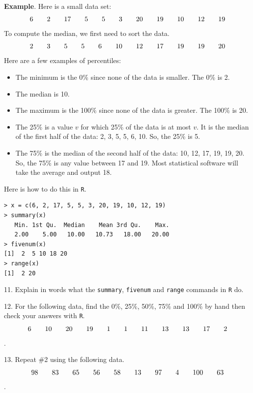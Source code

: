 \documentclass[10pt]{article}
\begin{document}
\textbf{Example}.  Here is a small data set:\vspace{-5pt}
\[6\HS 2\HS 17\HS 5\HS 5\HS 3\HS 20\HS 19\HS 10\HS 12\HS 19\vspace{-5pt}\]
To compute the median, we first need to sort the data.\vspace{-5pt}
\[2\HS 3\HS  5\HS  5\HS  6\HS 10\HS 12\HS 17\HS 19\HS 19\HS 20\vspace{-5pt}\]
Here are a few examples of percentiles:
\begin{itemize}
\item The minimum is the 0\% since none of the data is smaller.  The 0\% is 2.
\item The median is 10.
\item The maximum is the 100\% since none of the data is greater.  The 100\% is 20.
\item The 25\% is a value $v$ for which 25\% of the data is at most $v$.  It is 
   the median of the first half of the data: 2, 3, 5, 5, 6, 10.  So, the 25\% is 5.
\item The 75\% is the median of the second half of the data:  10, 12, 17, 19, 19, 20.
   So, the 75\% is any value  between 17 and 19.  Most statistical software will 
   take the average and output 18.
\end{itemize}
Here is how to do this in \texttt{R}.\vspace{-8pt}
\begin{verbatim}
> x = c(6, 2, 17, 5, 5, 3, 20, 19, 10, 12, 19)
> summary(x)
   Min. 1st Qu.  Median    Mean 3rd Qu.    Max. 
   2.00    5.00   10.00   10.73   18.00   20.00 
> fivenum(x)  
[1]  2  5 10 18 20
> range(x)
[1]  2 20
\end{verbatim}\vspace{-5pt}

11. Explain in words what the \texttt{summary}, \texttt{fivenum} and
\texttt{range} commands in \texttt{R} do.
\vspace{.7in}

12. For the following data, find the 0\%, 25\%, 50\%, 75\% and 100\%
by hand then check your answers with \texttt{R}.\vspace{-3pt}
\[6\hspace{20pt} 10\hspace{20pt} 20\hspace{20pt} 19\hspace{20pt}  1\hspace{20pt}  1\hspace{20pt} 11\hspace{20pt} 13\hspace{20pt} 13\hspace{20pt} 17\hspace{20pt}  2\].
\vspace{.7in}

13. Repeat \#2 using the following data.\vspace{-3pt}
\[98\hspace{20pt} 83\hspace{20pt} 65\hspace{20pt} 56\hspace{20pt}  58\hspace{20pt}  13\hspace{20pt} 97\hspace{20pt} 4\hspace{20pt} 100\hspace{20pt} 63\].


\vfill
\eject
\end{document}

